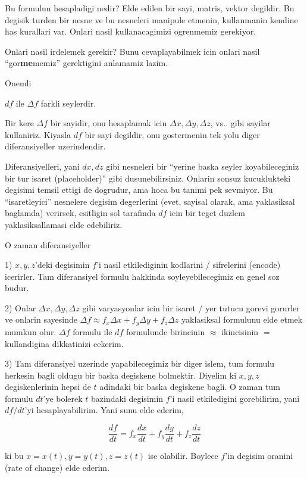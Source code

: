 \documentclass[12pt,fleqn]{article}
\begin{document}
Bu formulun hesapladigi nedir? Elde edilen bir sayi, matris, vektor
degildir. Bu degisik turden bir nesne ve bu nesneleri manipule etmenin,
kullanmanin kendine has kurallari var. Onlari nasil kullanacagimizi
ogrenmemiz gerekiyor. 

Onlari nasil irdelemek gerekir? Bunu cevaplayabilmek icin onlari nasil
``gor\textbf{me}memiz'' gerektigini anlamamiz lazim. 

Onemli

$df$ ile $\Delta f$ farkli seylerdir.

Bir kere $\Delta f$ bir sayidir, onu hesaplamak icin $\Delta x, \Delta y,
\Delta z$, vs.. gibi 
sayilar kullaniriz. Kiyasla $df$ bir sayi degildir, onu gostermenin 
tek yolu diger diferansiyeller uzerindendir. 

Diferansiyelleri, yani $dx, dz$ gibi nesneleri bir ``yerine baska seyler
koyabileceginiz bir tur isaret (placeholder)'' gibi
dusunebilirsiniz. Onlarin sonsuz kucuklukteki degisimi temsil ettigi de
dogrudur, ama hoca bu tanimi pek sevmiyor. Bu ``isaretleyici'' nesnelere
degisim degerlerini (evet, sayisal olarak, ama yaklasiksal baglamda) verirsek,
esitligin sol tarafinda $df$ icin bir teget duzlem yaklasiksallamasi elde
edebiliriz. 

O zaman diferansiyeller 

1) $x,y,z$'deki degisimin $f$'i nasil etkilediginin kodlarini / sifrelerini
(encode) icerirler. Tam diferansiyel formulu hakkinda soyleyebilecegimiz en
genel soz budur.

2) Onlar $\Delta x, \Delta
y, \Delta z$ gibi varyasyonlar icin bir isaret / yer tutucu 
gorevi gorurler ve onlarin sayesinde $\Delta f \approx f_x\Delta x + f_y \Delta y + f_z
\Delta z$ 
yaklasiksal formulunu elde etmek mumkun olur. $\Delta f$ formulu ile $df$ 
formulunde birincinin $\approx$ ikincisinin $=$ kullandigina dikkatinizi cekerim.

3) Tam diferansiyel uzerinde yapabilecegimiz bir diger islem, tum formulu
herkesin bagli oldugu bir baska degiskene bolmektir. Diyelim ki $x,y,z$
degiskenlerinin hepsi de $t$ adindaki bir baska degiskene bagli. O zaman
tum formulu $dt$'ye bolerek $t$ bazindaki degisimin $f$'i nasil
etkiledigini gorebilirim, yani $df/dt$'yi hesaplayabilirim. Yani sunu elde
ederim, 

\[ \frac{df}{dt} = f_x\frac{dx}{dt} + f_y\frac{dy}{dt} + f_z\frac{dz}{dt} \]

ki bu $x=x(t),y=y(t),z=z(t)$ ise olabilir. Boylece $f$'in degisim oranini
(rate of change) elde ederim. 
\end{document}
